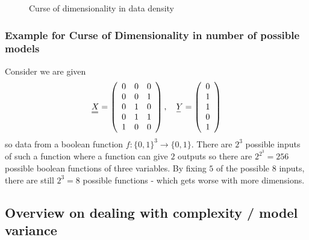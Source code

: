 \begin{figure}[!htb]
    \centering
    
    \caption{Curse of dimensionality in data density}
    \label{fig:curse_dens}
\end{figure}


\subsubsection{Example for Curse of Dimensionality in number of possible models\skipthis}
Consider we are given
\begin{equation}
    \mat{X}=\left(\begin{array}{lll}
    0 & 0 & 0 \\
    0 & 0 & 1 \\
    0 & 1 & 0 \\
    0 & 1 & 1 \\
    1 & 0 & 0
    \end{array}\right), \quad \vec{Y}=\left(\begin{array}{l}
    0 \\
    1 \\
    1 \\
    0 \\
    1
    \end{array}\right)
\end{equation}
so data from a boolean function $f:\{0,1\}^3 \rightarrow \{0,1\}$.
There are $2^3$ possible inputs of such a function where a function
can give $2$ outputs so there are $2^{2^3} = 256$ possible boolean functions
of three variables. By fixing $5$ of the possible $8$ inputs, there are
still $2^3 = 8$ possible functions - which \textcolor{red1}{gets worse 
with more dimensions}.


\subsection{Overview on dealing with complexity / model variance}


